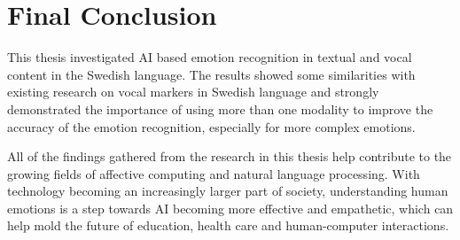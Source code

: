 \section{Final Conclusion}
\label{sec:con-final-conclusion}
This thesis investigated AI based emotion recognition in textual and vocal content in the Swedish language. The results showed some similarities with existing research on vocal markers in Swedish language and strongly demonstrated the importance of using more than one modality to improve the accuracy of the emotion recognition, especially for more complex emotions. 

All of the findings gathered from the research in this thesis help contribute to the growing fields of affective computing and natural language processing. With technology becoming an increasingly larger part of society, understanding human emotions is a step towards AI becoming more effective and empathetic, which can help mold the future of education, health care and human-computer interactions.
